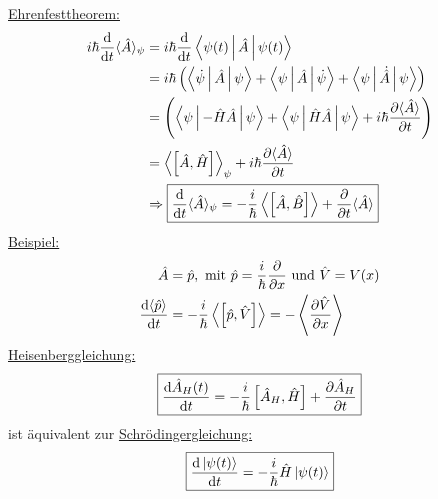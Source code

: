 	\underline{Ehrenfesttheorem:}
		\begin{align*}
			i \hbar \frac{\mathrm{d}}{\mathrm{d} t} \langle \hat{A} \rangle_\psi
			&= i \hbar \frac{\mathrm{d}}{\mathrm{d} t} \Braket{\psi(t) | \hat{A} | \psi(t)} \\ 
			&= i \hbar \left( \Braket{\dot{\psi} | \hat{A} | \psi} + \Braket{\psi | \hat{A} | \dot{\psi}} + \Braket{\psi | \dot{\hat{A}} | \psi} \right) \\ 
			&= \left( \Braket{\psi | - \hat{H} \hat{A} | \psi} + \Braket{\psi | \hat{H} \hat{A} | \psi} + i\hbar \frac{\partial \langle {\hat{A}} \rangle}{\partial t} 
			\right) \\ 
			&= \left\langle {\left[\hat{A} , \hat{H} \right]} \right\rangle_\psi + i\hbar \frac{\partial \langle {\hat{A}} \rangle}{\partial t} 		\\
			&\Rightarrow \boxed{\frac{\mathrm{d}}{\mathrm{d} t} \langle {\hat{A}} \rangle_\psi = -\frac{i}{\hbar} \left\langle {\left[ \hat{A} , \hat{B} \right]} \right\rangle + \frac{\partial}{\partial t} \langle {\hat{A}} \rangle}	
		\end{align*} %
	\underline{Beispiel:}
		\begin{align*}
			\hat{A} &= \hat{p} , \text{~mit~} \hat{p} = \frac{i}{\hbar} \frac{\partial}{\partial x} \text{~und~}
			\hat{V} = V(x) \\
			\frac{\mathrm{d} \langle {\hat{p}} \rangle}{\mathrm{d} t} &=
			- \frac{i}{\hbar} \left\langle {\left[ \hat{p}, \hat{V}\right]} \right\rangle = - \left\langle {\frac{\partial \hat{V}}{\partial x}} \right\rangle 
		\end{align*}
	\underline{Heisenberggleichung:}
		\begin{align*}
			\boxed{\frac{\mathrm{d} \hat{A}_H(t)}{\mathrm{d} t}
					= - \frac{i}{\hbar} \left[ \hat{A}_H , \hat{H}\right]
					+ \frac{\partial \hat{A}_H}{\partial t}	}
		\end{align*}
	ist äquivalent zur \underline{Schrödingergleichung:}
		\begin{equation*}
			\boxed{\frac{\mathrm{d} \ket{\psi(t)}}{\mathrm{d} t} =
					- \frac{i}{\hbar} \hat{H} \ket{\psi(t)}
					}
		\end{equation*}